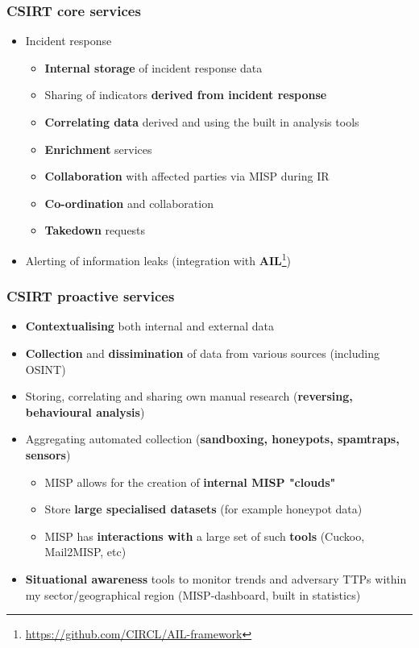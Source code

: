 \begin{frame}
\frametitle{CSIRT core services}
\begin{itemize}
	\item Incident response
	\begin{itemize}
		\item {\bf Internal storage} of incident response data
		\item Sharing of indicators {\bf derived from incident response}
		\item {\bf Correlating data} derived and using the built in analysis tools
		\item {\bf Enrichment} services
		\item {\bf Collaboration} with affected parties via MISP during IR
		\item {\bf Co-ordination} and collaboration
		\item {\bf Takedown} requests
	\end{itemize}
	\item Alerting of information leaks (integration with {\bf AIL}\footnote{\url{https://github.com/CIRCL/AIL-framework}})
\end{itemize}
\end{frame}

\begin{frame}
\frametitle{CSIRT proactive services}
\begin{itemize}
	\item {\bf Contextualising} both internal and external data
	\item {\bf Collection} and {\bf dissimination} of data from various sources (including OSINT)
	\item Storing, correlating and sharing own manual research ({\bf reversing, behavioural analysis})
	\item Aggregating automated collection ({\bf sandboxing, honeypots, spamtraps, sensors})
	\begin{itemize}
		\item MISP allows for the creation of {\bf internal MISP "clouds"}
		\item Store {\bf large specialised datasets} (for example honeypot data)
		\item MISP has {\bf interactions with} a large set of such {\bf tools} (Cuckoo, Mail2MISP, etc)
	\end{itemize}
	\item {\bf Situational awareness} tools to monitor trends and adversary TTPs within my sector/geographical region (MISP-dashboard, built in statistics)
\end{itemize}
\end{frame}

